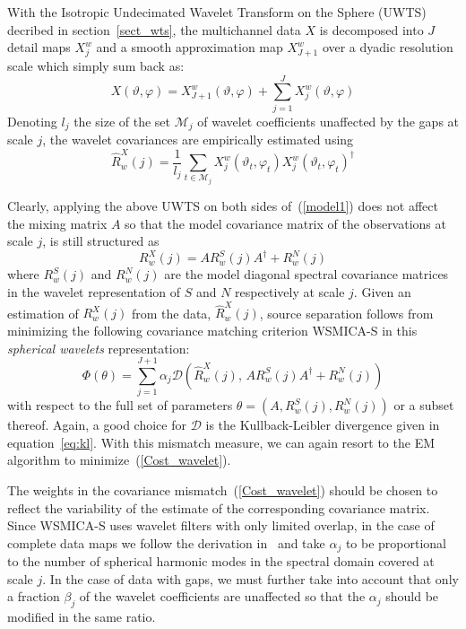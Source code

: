 With the Isotropic Undecimated Wavelet Transform on the Sphere (UWTS) decribed in section~\ref{sect_wts}, the multichannel data $X$ is decomposed 
into $J$ detail maps $X_{j}^w$ and a smooth approximation map $X_{J+1}^w$ over a dyadic resolution scale which simply sum back as: 
\begin{equation}  
X(\vartheta, \varphi) = X_{J+1}^w (\vartheta, \varphi) + \sum_{j=1}^{J} X_{j}^w(\vartheta, \varphi)
\end{equation}
Denoting $l_j$ the size of the set $\mathcal{M}_j$ of wavelet coefficients unaffected by the gaps at scale $j$, the wavelet covariances are empirically estimated using
\begin{equation}
\widehat{R}_w^X (j) = \frac{1}{l_j }  \sum_{t \in  \mathcal{M}_j } X_j^w( \vartheta_t, \varphi_t )X_j^w( \vartheta_t, \varphi_t ) ^\dagger 
\end{equation}

Clearly, applying the above UWTS on both sides of~(\ref{model1}) does not affect the mixing matrix $A$ so that 
the model covariance matrix of the observations at scale $j$, is still structured as  
\begin{equation}
R_w^X(j) = A R_w^S(j) A^{\dagger} +   R_w^N(j) 
\end{equation}
where $R_w^S(j)$ and $R_w^N(j)$ are the model diagonal spectral covariance matrices in the wavelet representation of $S$ and $N$ respectively 
at scale $j$. Given an estimation of $R_w^X(j)$ from the data, $\widehat{R}_w^X(j)$, source separation follows from  minimizing the following 
covariance matching criterion WSMICA-S in this \emph{spherical wavelets} representation:  
\begin{equation}\label{Cost_wavelet}
 \Phi (\theta) =  \sum _{j=1}^{J+1}  \alpha_j \mathcal{D} \left( \widehat{R}_w^X(j), \,
    A R_w^S(j) A^{\dagger} + R_w^N(j) \right)
\end{equation}
with respect to the full set of parameters $\theta = (A,R_w^S(j), R_w^N(j) )$ or a subset thereof. Again, a good choice for $\mathcal{D}$ is 
the Kullback-Leibler divergence given in equation~\ref{eq:kl}. With this mismatch measure, we can again resort to the EM algorithm to minimize~(\ref{Cost_wavelet}). 

The weights in the covariance mismatch~(\ref{Cost_wavelet}) should be chosen to reflect the variability of the estimate of the corresponding
covariance matrix. Since WSMICA-S uses wavelet filters with only limited overlap, in the case of complete data maps we follow the derivation 
in~\cite{ica:Del2003} and take $\alpha_j$ to be proportional to the number of spherical harmonic modes in the spectral domain covered at 
scale $j$. In the case of data with gaps, we must further take into account that only a fraction $\beta_j$ of the wavelet coefficients are 
unaffected so that the $\alpha_j$ should be modified in the same ratio. 

